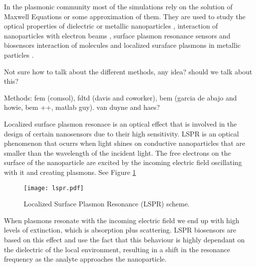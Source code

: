 In the plasmonic community most of the simulations rely on the solution of 
Maxwell Equations or some approximation of them. They are used to study the 
optical properties of dielectric or metallic nanoparticles \cite{Hohenester2018,
JungPedersenSondergaardPedersenLarsenNielsen2010, VideenSun2003,
MayergoyzFredkinZhang2005, MayergoyzZhang2007}, interaction of nanoparticles
with electron beams \cite{GarciadeabajoAizpurua1997, GarciadeabajoHowie2002},
surface plasmon resonance sensors \cite{JungCampbellChinowskyMarYee1998} and
biosensors \cite{HaesETal2004, HaesVanduyne2002} interaction of molecules and
localized suraface plasmons in metallic particles \cite{DavisGomezVernon2010,
AntosiewiczApellClaudioKall2011}.

{\color{red} Not sure how to talk about the different methods, any idea? should
we talk about this? 

Methods: fem (comsol), fdtd (davis and coworker), bem (garcia de abajo and 
howie, bem ++, matlab guy). van duyne and haes? }

Localized surface plasmon resonace is an optical effect that is involved in the
design of certain nanosensors due to their high sensitivity. LSPR is an 
optical phenomenon that ocurrs when light shines on conductive nanoparticles
that are smaller than the wavelength of the incident light. The free electrons
on the surface of the nanoparticle are excited by the incoming electric field
oscillating with it and creating plasmons. See Figure \ref{fig:lspr}

\begin{figure}[h] %
   \centering
   \texttt{[image: lspr.pdf]} 
   \caption{Localized Surface Plasmon Resonance (LSPR) scheme. }
   \label{fig:lspr}
\end{figure}

When plasmons resonate with the incoming electric field we end up with high 
levels of extinction, which is absorption plus scattering. LSPR biosensors are 
based on this effect and use the fact that this behaviour is highly dependant
on the dielectric of the local environment, resulting in a shift in the 
resonance frequency as the analyte approaches the nanoparticle.  


